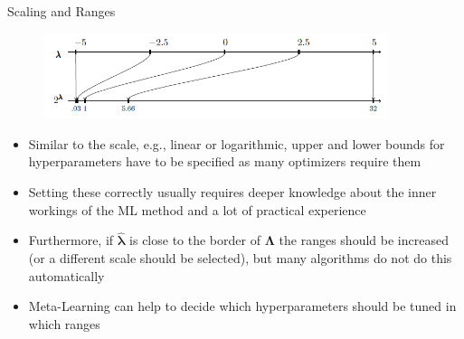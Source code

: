 \documentclass[11pt,compress,t,notes=noshow, xcolor=table]{beamer}
\begin{document}
\begin{frame}[allowframebreaks]{Scaling and Ranges}
\begin{figure}[htb]
\centering
\includegraphics[width=0.9\textwidth]{figure_man/scaling-ranges-tikz.PNG}

\end{figure}

\framebreak

    \begin{itemize}
        \item Similar to the scale, e.g., linear or logarithmic, upper and lower bounds for hyperparameters have to be specified as many optimizers require them
        \item Setting these correctly usually requires deeper knowledge about the inner workings of the ML method and a lot of practical experience
        \item Furthermore, if $\bm{\hat{\lambda}}$ is close to the border of $\bm{\Lambda}$ the ranges should be increased (or a different scale should be selected), but many algorithms do not do this automatically
        \item Meta-Learning can help to decide which hyperparameters should be tuned in which ranges
    \end{itemize}

\end{frame}
\end{document}

